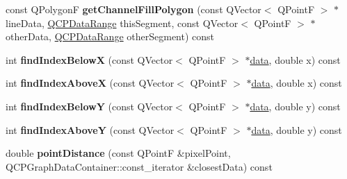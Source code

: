 \begin{DoxyCompactItemize}
\item 
const Q\+PolygonF {\bfseries get\+Channel\+Fill\+Polygon} (const Q\+Vector$<$ Q\+PointF $>$ $\ast$line\+Data, \hyperlink{classQCPDataRange}{Q\+C\+P\+Data\+Range} this\+Segment, const Q\+Vector$<$ Q\+PointF $>$ $\ast$other\+Data, \hyperlink{classQCPDataRange}{Q\+C\+P\+Data\+Range} other\+Segment) const \hypertarget{classQCPGraph_aa112ba720973f714f98588985e51e782}{}\label{classQCPGraph_aa112ba720973f714f98588985e51e782}

\item 
int {\bfseries find\+Index\+BelowX} (const Q\+Vector$<$ Q\+PointF $>$ $\ast$\hyperlink{classQCPGraph_a04514a2b1fb61a280ead66abe80b89ab}{data}, double x) const \hypertarget{classQCPGraph_a6f4e9461d5925be9228fc4760249a04f}{}\label{classQCPGraph_a6f4e9461d5925be9228fc4760249a04f}

\item 
int {\bfseries find\+Index\+AboveX} (const Q\+Vector$<$ Q\+PointF $>$ $\ast$\hyperlink{classQCPGraph_a04514a2b1fb61a280ead66abe80b89ab}{data}, double x) const \hypertarget{classQCPGraph_abab2a75b5e63630432bdd1f3b57f07fa}{}\label{classQCPGraph_abab2a75b5e63630432bdd1f3b57f07fa}

\item 
int {\bfseries find\+Index\+BelowY} (const Q\+Vector$<$ Q\+PointF $>$ $\ast$\hyperlink{classQCPGraph_a04514a2b1fb61a280ead66abe80b89ab}{data}, double y) const \hypertarget{classQCPGraph_a6c4d556de3d1e02f548401001f72c6ff}{}\label{classQCPGraph_a6c4d556de3d1e02f548401001f72c6ff}

\item 
int {\bfseries find\+Index\+AboveY} (const Q\+Vector$<$ Q\+PointF $>$ $\ast$\hyperlink{classQCPGraph_a04514a2b1fb61a280ead66abe80b89ab}{data}, double y) const \hypertarget{classQCPGraph_adf50243f1df203883a2187089734bfcb}{}\label{classQCPGraph_adf50243f1df203883a2187089734bfcb}

\item 
double {\bfseries point\+Distance} (const Q\+PointF \&pixel\+Point, Q\+C\+P\+Graph\+Data\+Container\+::const\+\_\+iterator \&closest\+Data) const \hypertarget{classQCPGraph_a619f22c55dffe9e6f380c5c79e3d9f0f}{}\label{classQCPGraph_a619f22c55dffe9e6f380c5c79e3d9f0f}

\end{DoxyCompactItemize}
